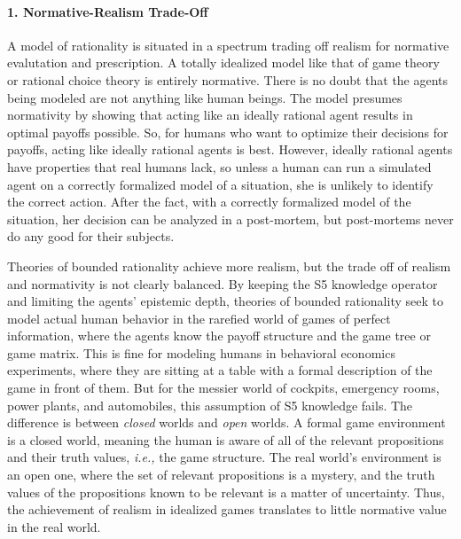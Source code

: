 \paragraph{1. Normative-Realism Trade-Off} 
A model of rationality is situated in a spectrum trading off realism for normative evalutation and prescription. A totally idealized model like that of game theory or rational choice theory is entirely normative. There is no doubt that the agents being modeled are not anything like human beings. The model presumes normativity by showing that acting like an ideally rational agent results in optimal payoffs possible. So, for humans who want to optimize their decisions for payoffs, acting like ideally rational agents is best. However, ideally rational agents have properties that real humans lack, so unless a human can run a simulated agent on a correctly formalized model of a situation, she is unlikely to identify the correct action. After the fact, with a correctly formalized model of the situation, her decision can be analyzed in a post-mortem, but post-mortems never do any good for their subjects.


Theories of bounded rationality achieve more realism, but the trade off of realism and normativity is not clearly balanced. By keeping the S5 knowledge operator and limiting the agents' epistemic depth, theories of bounded rationality seek to model actual human behavior in the rarefied world of games of perfect information, where the agents know the payoff structure and the game tree or game matrix. This is fine for modeling humans in behavioral economics experiments, where they are sitting at a table with a formal description of the game in front of them. But for the messier world of cockpits, emergency rooms, power plants, and automobiles, this assumption of S5 knowledge fails. The difference is between \emph{closed } worlds and \emph{open} worlds. A formal game environment is a closed world, meaning the human is aware of all of the relevant propositions and their truth values, \emph{i.e.,} the game structure. The real world's environment is an open one, where the set of relevant propositions is a mystery, and the truth values of the propositions known to be relevant is a matter of uncertainty. Thus, the achievement of realism in idealized games translates to little normative value in the real world.

